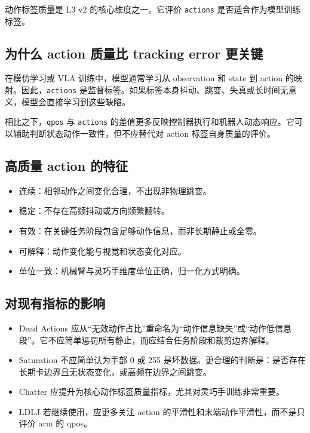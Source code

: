 \documentclass[UTF8,zihao=-4]{ctexart}
\begin{document}
动作标签质量是 L3 v2 的核心维度之一。它评价 \texttt{actions} 是否适合作为模型训练标签。

\subsection{为什么 action 质量比 tracking error 更关键}

在模仿学习或 VLA 训练中，模型通常学习从 observation 和 state 到 action 的映射。因此，\texttt{actions} 是监督标签。如果标签本身抖动、跳变、失真或长时间无意义，模型会直接学习到这些缺陷。

相比之下，\texttt{qpos} 与 \texttt{actions} 的差值更多反映控制器执行和机器人动态响应。它可以辅助判断状态动作一致性，但不应替代对 action 标签自身质量的评价。

\subsection{高质量 action 的特征}

\begin{itemize}
  \item 连续：相邻动作之间变化合理，不出现非物理跳变。
  \item 稳定：不存在高频抖动或方向频繁翻转。
  \item 有效：在关键任务阶段包含足够动作信息，而非长期静止或全零。
  \item 可解释：动作变化能与视觉和状态变化对应。
  \item 单位一致：机械臂与灵巧手维度单位正确，归一化方式明确。
\end{itemize}

\subsection{对现有指标的影响}

\begin{itemize}
  \item Dead Actions 应从“无效动作占比”重命名为“动作信息缺失”或“动作低信息段”。它不应简单惩罚所有静止，而应结合任务阶段和裁剪边界解释。
  \item Saturation 不应简单认为手部 0 或 255 是坏数据。更合理的判断是：是否存在长期卡边界且无状态变化，或高频在边界之间跳变。
  \item Chatter 应提升为核心动作标签质量指标，尤其对灵巧手训练非常重要。
  \item LDLJ 若继续使用，应更多关注 action 的平滑性和末端动作平滑性，而不是只评价 arm 的 qpos。
\end{itemize}
\end{document}
